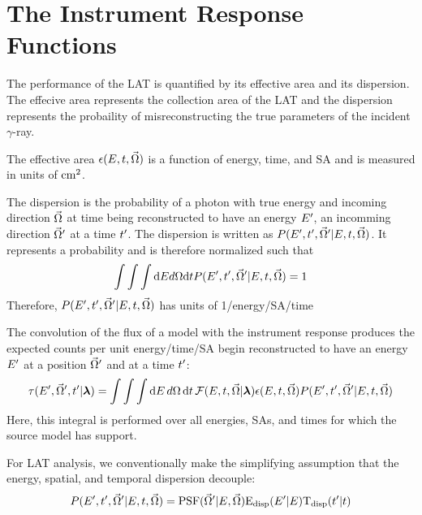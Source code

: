\section{The  Instrument Response Functions}


The performance of the LAT is quantified by its effective area
and its dispersion. The effecive area represents the collection area of the
\ac{LAT} and the dispersion represents the probaility of misreconstructing
the true parameters of the incident $\gamma$-ray.

The
effective area $\epsilon(E,t,\vec\Omega)$
is a function of energy, time, and \ac{SA} and is measured in units of 
$\text{cm}^2$. 

The dispersion is the probability of a photon with true energy
\energy and incoming direction $\vec\Omega$ at time \time being
reconstructed to have an energy $E'$, an incomming direction
$\vec\Omega'$ at a time $t'$.  The dispersion is written as
$P(E',t',\vec\Omega'|E,t,\vec\Omega)$.
It represents a probability and is therefore normalized such that
\begin{equation}
  \int \int \int \text{d}E d\Omega \text{d}t 
  P(E',t',\vec\Omega'|E,t,\vec\Omega) = 1
\end{equation}
Therefore,
$P(E',t',\vec\Omega'|E,t,\vec\Omega)$
has units of 1/energy/\acl{SA}/time

The convolution of the flux of a model with the instrument response 
produces the expected counts per unit energy/time/\acl{SA}
begin reconstructed to have 
an energy $E'$ 
at a position $\vec\Omega'$ and at a time $t'$:
\begin{equation}
  \eqnlabel{eventrate}
  \eventrate(\energy',\solidangle',\time'|\modelparams)
  = \int \int \int \denergy \, \dsolidangle \, \dtime \,
  \fluxdensity(\energy,\time,\vec\Omega|\modelparams) 
  \effectivearea(\energy,\time,\solidangle) \dispersion(\energy',\time',\solidangle'|\energy,\time,\solidangle)
\end{equation}
Here, this integral is performed over all energies, \acp{SA}, and times
for which the source model has support.

For LAT analysis, we conventionally make the simplifying assumption that
the energy, spatial, and temporal dispersion decouple:
\begin{equation}
  P(E',t',\vec\Omega'|E,t,\vec\Omega) = 
  \text{PSF}(\vec\Omega'|E,\vec\Omega) \text{E}_\text{disp}(E'|E) \text{T}_\text{disp}(t'|t)
\end{equation}

